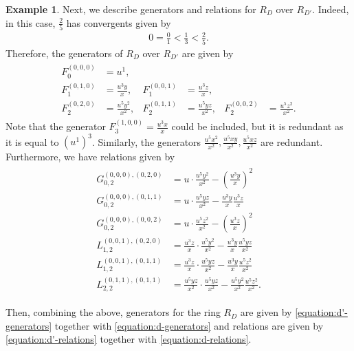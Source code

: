 \documentclass{amsart}
\theoremstyle{plain}
\theoremstyle{definition}
\newtheorem{example}[thm]{Example}
\theoremstyle{remark}
\numberwithin{equation}{section}
\begin{document}
\begin{example}
	Next, we describe generators and relations for $R_D$ over $R_{D'}$.
	Indeed, in this case, $\frac{2}{5}$ has convergents given by
	\begin{align*}
		0 = \frac{0}{1} < \frac{1}{3} < \frac{2}{5}.
	\end{align*}
	Therefore, the generators of $R_D$ over $R_{D'}$ are given by
	\begin{align}
		\begin{aligned}
		\label{equation:d-generators}
		F_0^{(0,0,0)} &= u^1, \\
		F_1^{(0,1,0)} &= \frac{u^3y}{x}, &F_1^{(0,0,1)} &= \frac{u^3z}{x}, \\
		F_2^{(0,2,0)} &= \frac{u^5y^2}{x^2}, &F_2^{(0,1,1)} &= \frac{u^5yz}{x^2}, &F_2^{(0,0,2)} &= \frac{u^5z^2}{x^2}.
	\end{aligned}
	\end{align}
Note that the generator $F_3^{(1,0,0)} = \frac{u^3x}{x}$ could be included, but it is redundant as it is equal to $(u^1)^3$.
	Similarly, the generators $\frac{u^5x^2}{x^2}, \frac{u^5xy}{x^2}, \frac{u^5xz}{x^2}$ are redundant.
	Furthermore, we have relations given by
	\begin{align}
		\begin{aligned}
		\label{equation:d-relations}
		G_{0,2}^{(0,0,0),(0,2,0)} &= u \cdot \frac{u^5 y^2}{x^2} - \left( \frac{u^3y}{x} \right)^2 \\
		G_{0,2}^{(0,0,0),(0,1,1)} &= u \cdot \frac{u^5 yz}{x^2} -  \frac{u^3y}{x} \frac{u^3z}{x} \\
		G_{0,2}^{(0,0,0),(0,0,2)} &= u \cdot \frac{u^5 z^2}{x^2} - \left( \frac{u^3z}{x} \right)^2 \\
		L_{1,2}^{(0,0,1), (0,2,0)} &= \frac{u^3z}{x}\cdot \frac{u^5y^2}{x^2} - \frac{u^3y}{x}\frac{u^5yz}{x^2} \\
		L_{1,2}^{(0,0,1), (0,1,1)} &= \frac{u^3z}{x}\cdot \frac{u^5yz}{x^2} - \frac{u^3y}{x}\frac{u^5z^2}{x^2} \\
		L_{2,2}^{(0,1,1),(0,1,1)} &= \frac{u^5yz}{x^2}\cdot \frac{u^5 yz}{x^2} - \frac{u^5y^2}{x^2}\frac{u^5z^2}{x^2}.
\end{aligned}
\end{align}

	Then, combining the above, generators for the ring $R_D$ are given by	
	\eqref{equation:d'-generators} together with
	\eqref{equation:d-generators}
	and relations are given by
	\eqref{equation:d'-relations} together with \eqref{equation:d-relations}.
\end{example}
\end{document}
